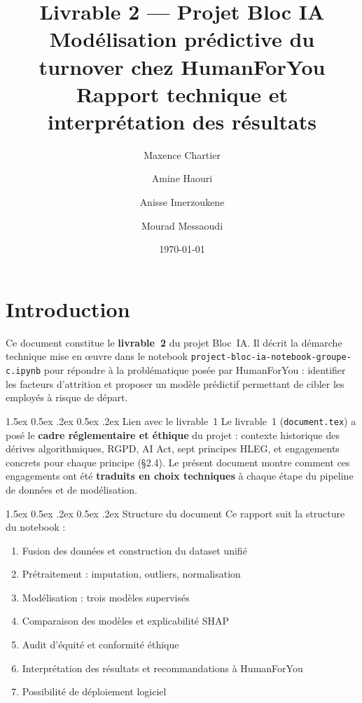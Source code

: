 \documentclass[12pt,a4paper]{article}
\title{Livrable 2 --- Projet Bloc IA \\ \Large Modélisation prédictive du turnover chez HumanForYou \\ \large Rapport technique et interprétation des résultats}
\author{
    Maxence Chartier \and
    Amine Haouri \and
    Anisse Imerzoukene \and
    Mourad Messaoudi
}
\date{\today}
\makeatletter
\renewcommand\paragraph{\@startsection{paragraph}{4}{\z@}%
  {1.5ex \@plus 0.5ex \@minus .2ex}%
  {0.5ex \@plus .2ex}%
  {\normalfont\normalsize\bfseries}}
\makeatother
\begin{document}
\maketitle
\thispagestyle{empty}
\newpage
{\small
\tableofcontents
}
\newpage

\section{Introduction}

Ce document constitue le \textbf{livrable~2} du projet Bloc~IA. Il décrit la démarche technique mise en \oe uvre dans le notebook \texttt{project-bloc-ia-notebook-groupe-c.ipynb} pour répondre à la problématique posée par HumanForYou : identifier les facteurs d'attrition et proposer un modèle prédictif permettant de cibler les employés à risque de départ.

\paragraph{Lien avec le livrable~1} Le livrable~1 (\texttt{document.tex}) a posé le \textbf{cadre réglementaire et éthique} du projet : contexte historique des dérives algorithmiques, RGPD, AI Act, sept principes HLEG, et engagements concrets pour chaque principe (§2.4). Le présent document montre comment ces engagements ont été \textbf{traduits en choix techniques} à chaque étape du pipeline de données et de modélisation.

\paragraph{Structure du document} Ce rapport suit la structure du notebook :
\begin{enumerate}
    \item Fusion des données et construction du dataset unifié
    \item Prétraitement : imputation, outliers, normalisation
    \item Modélisation : trois modèles supervisés
    \item Comparaison des modèles et explicabilité SHAP
    \item Audit d'équité et conformité éthique
    \item Interprétation des résultats et recommandations à HumanForYou
    \item Possibilité de déploiement logiciel
\end{enumerate}
\end{document}
